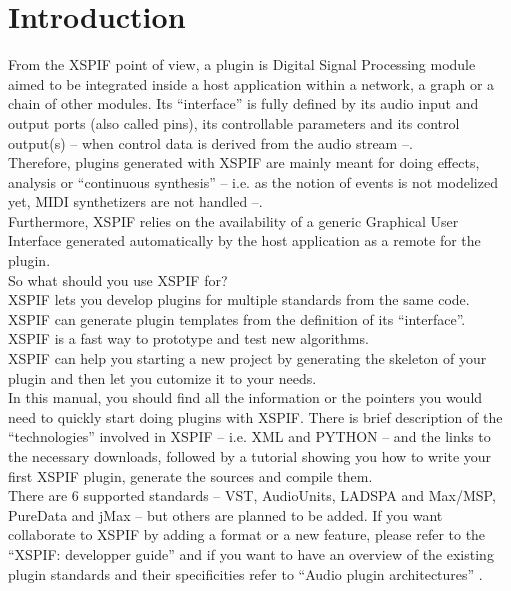 
\chapter{Introduction}

\noindent From the XSPIF point of view, a plugin is Digital Signal
Processing module aimed to be integrated inside a host application
within a network, a graph or a chain of other modules. Its ``interface''
is fully defined by its audio input and output ports (also called
pins), its controllable parameters and its control output(s) -- when
control data is derived from the audio stream --.\\
\noindent Therefore, plugins generated with XSPIF are mainly meant for
doing effects, analysis or ``continuous synthesis'' -- i.e. as the notion
of events is not modelized yet, MIDI synthetizers are not handled --.\\
\noindent Furthermore, XSPIF relies on the availability of a generic
Graphical User Interface generated automatically by the host
application as a remote for the plugin.\\

\noindent So what should you use XSPIF for?\\
XSPIF lets you develop plugins for multiple standards from the same
code.\\ 
XSPIF can generate plugin templates from the definition of its
``interface''. \\
XSPIF is a fast way to prototype and test new algorithms.\\
XSPIF can help you starting a new project by generating the skeleton
of your plugin and then let you cutomize it to your needs.\\

\noindent In this manual, you should find all the information or the
pointers you would need to quickly start doing plugins with
XSPIF. There is brief description of the ``technologies'' involved in
XSPIF -- i.e. XML and PYTHON -- and the links to the necessary downloads,
followed by a tutorial showing you how to write your first XSPIF
plugin, generate the sources and compile them.\\

\noindent There are 6 supported standards -- VST, AudioUnits,
LADSPA and Max/MSP, PureData and jMax -- but others are planned to be
added. If you want collaborate to XSPIF by adding a format or a new
feature, please refer to the ``XSPIF: developper guide''
\cite{xspif:developerguide} and if you want to have an overview of the
existing plugin standards and their specificities refer to ``Audio
plugin architectures'' \cite{pluginarch}.

